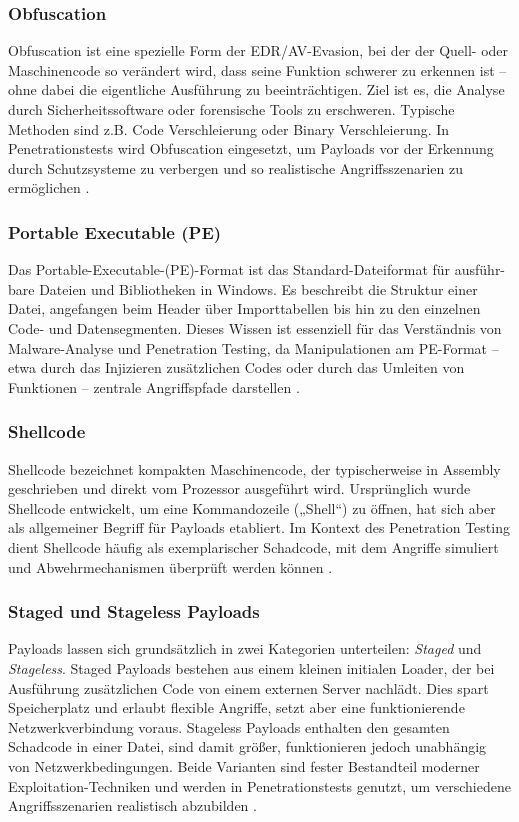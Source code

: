 \subsubsection{Obfuscation}
Obfuscation ist eine spezielle Form der EDR/AV-Evasion, bei der der Quell- oder Maschinencode so verändert wird, dass seine Funktion schwerer zu erkennen ist – ohne dabei die eigentliche Ausführung zu beeinträchtigen. Ziel ist es, die Analyse durch Sicherheitssoftware oder forensische Tools zu erschweren. Typische Methoden sind z.B. Code Verschleierung oder Binary Verschleierung. In Penetrationstests wird Obfuscation eingesetzt, um Payloads vor der Erkennung durch Schutzsysteme zu verbergen und so realistische Angriffsszenarien zu ermöglichen \cite{you2010_obfuscation}.
\subsubsection{Portable Executable (PE)}
Das Portable-Executable-(PE)-Format ist das Standard-Dateiformat für ausführ-
bare Dateien und Bibliotheken in Windows. Es beschreibt die Struktur einer Datei, angefangen beim Header über Importtabellen bis hin zu den einzelnen Code- und Datensegmenten. Dieses Wissen ist essenziell für das Verständnis von Malware-Analyse und Penetration Testing, da Manipulationen am PE-Format – etwa durch das Injizieren zusätzlichen Codes oder durch das Umleiten von Funktionen – zentrale Angriffspfade darstellen \cite{microsoft_pe}.
\subsubsection{Shellcode}
Shellcode bezeichnet kompakten Maschinencode, der typischerweise in Assembly geschrieben und direkt vom Prozessor ausgeführt wird. Ursprünglich wurde Shellcode entwickelt, um eine Kommandozeile („Shell“) zu öffnen, hat sich aber als allgemeiner Begriff für Payloads etabliert. Im Kontext des Penetration Testing dient Shellcode häufig als exemplarischer Schadcode, mit dem Angriffe simuliert und Abwehrmechanismen überprüft werden können \cite{erickson2003}.
\subsubsection{Staged und Stageless Payloads}
Payloads lassen sich grundsätzlich in zwei Kategorien unterteilen: \textit{Staged} und \textit{Stageless}. Staged Payloads bestehen aus einem kleinen initialen Loader, der bei Ausführung zusätzlichen Code von einem externen Server nachlädt. Dies spart Speicherplatz und erlaubt flexible Angriffe, setzt aber eine funktionierende Netzwerkverbindung voraus. Stageless Payloads enthalten den gesamten Schadcode in einer Datei, sind damit größer, funktionieren jedoch unabhängig von Netzwerkbedingungen. Beide Varianten sind fester Bestandteil moderner Exploitation-Techniken und werden in Penetrationstests genutzt, um verschiedene Angriffsszenarien realistisch abzubilden \cite{metasploit_stageless}.
